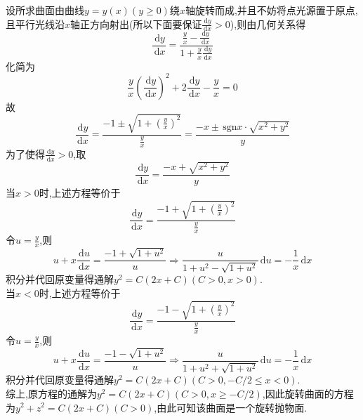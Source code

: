 \documentclass[titlepage,11pt,a4paper,twoside]{report}
\makeatletter
\newcommand\diff{\,\mathrm{d}}
\newcommand\sgn{\,\mathrm{sgn}}
\newenvironment{solve}{\par
	\pushQED{\qed}%
	\normalfont \topsep1\p@\@plus6\p@\relax
	\trivlist
	\item\relax
	{\hspace*{\parindent}{\heiti 解}\@addpunct{:}}\hspace\labelsep\ignorespaces
}{%
	\popQED\endtrivlist\@endpefalse
}
\makeatother
\begin{document}
\begin{solve}设所求曲面由曲线$y=y(x)(y\geq0)$绕$x$轴旋转而成,并且不妨将点光源置于原点,且平行光线沿$x$轴正方向射出(所以下面要保证$\frac{\diff y}{\diff x}>0$),则由几何关系得
\[\frac{\diff y}{\diff x}=\frac{\frac{y}{x}-\frac{\diff y}{\diff x}}{1+\frac{y}{x}\frac{\diff y}{\diff x}}\]
化简为
\[\frac{y}{x}\left(\frac{\diff y}{\diff x}\right)^2+2\frac{\diff y}{\diff x}-\frac{y}{x}=0\]
故
\[\frac{\diff y}{\diff x}=\frac{-1\pm\sqrt{1+\left(\frac{y}{x}\right)^2}}{\frac{y}{x}}=\frac{-x\pm\sgn x\cdot\sqrt{x^2+y^2}}{y}\]
为了使得$\frac{\diff y}{\diff x}>0$,取
\[\frac{\diff y}{\diff x}=\frac{-x+\sqrt{x^2+y^2}}{y}\]
当$x>0$时,上述方程等价于
\[\frac{\diff y}{\diff x}=\frac{-1+\sqrt{1+\left(\frac{y}{x}\right)^2}}{\frac{y}{x}}\]
令$u=\frac{y}{x}$,则
\[u+x\frac{\diff u}{\diff x}=\frac{-1+\sqrt{1+u^2}}{u}\Rightarrow\frac{u}{1+u^2-\sqrt{1+u^2}}\diff u=-\frac{1}{x}\diff x\]
积分并代回原变量得通解$y^2=C(2x+C)(C>0,x>0)$.\\
当$x<0$时,上述方程等价于
\[\frac{\diff y}{\diff x}=\frac{-1-\sqrt{1+\left(\frac{y}{x}\right)^2}}{\frac{y}{x}}\]
令$u=\frac{y}{x}$,则
\[u+x\frac{\diff u}{\diff x}=\frac{-1-\sqrt{1+u^2}}{u}\Rightarrow\frac{u}{1+u^2+\sqrt{1+u^2}}\diff u=-\frac{1}{x}\diff x\]
积分并代回原变量得通解$y^2=C(2x+C)(C>0,-C/2\leq x<0)$.\\
综上,原方程的通解为$y^2=C(2x+C)(C>0,x\geq-C/2)$,因此旋转曲面的方程为$y^2+z^2=C(2x+C)(C>0)$,由此可知该曲面是一个旋转抛物面.
\end{solve}
\end{document}
